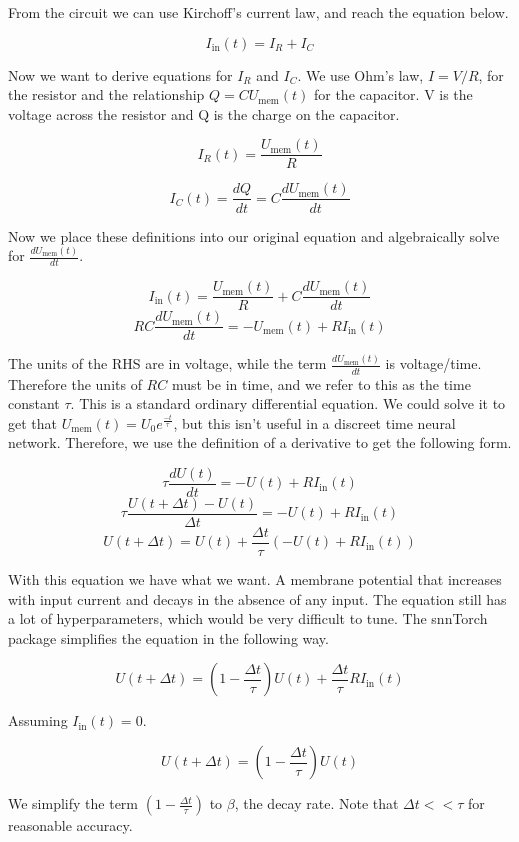 \documentclass [MS] {UCLAthesis}
\begin{document}
From the circuit we can use Kirchoff's current law, and reach the equation below.

$$ I_\text{in}(t) = I_R + I_C $$

Now we want to derive equations for $ I_R $ and $ I_C $. We use Ohm's law, $ I = V/R $, for the resistor and the relationship $ Q = CU_\text{mem}(t) $ for the capacitor. V is the voltage across the resistor and Q is the charge on the capacitor.  

$$ I_R(t) = \frac{U_\text{mem}(t)}{R} $$

$$ I_C(t) = \frac{dQ}{dt} = C \frac{dU_\text{mem}(t)}{dt} $$

Now we place these definitions into our original equation and algebraically solve for $ \frac{dU_\text{mem}(t)}{dt} $.

$$ I_\text{in}(t) = \frac{U_\text{mem}(t)}{R} + C \frac{dU_\text{mem}(t)}{dt} $$
$$ RC \frac{dU_\text{mem}(t)}{dt} = -U_\text{mem}(t) + RI_\text{in}(t)$$

The units of the RHS are in voltage, while the term $\frac{dU_\text{mem}(t)}{dt}$ is voltage/time. Therefore the units of $RC$ must be in time, and we refer to this as the time constant $\tau$. This is a standard ordinary differential equation. We could solve it to get that $ U_\text{mem}(t) = U_0 e ^{\frac{-t}{\tau}} $, but this isn't useful in a discreet time neural network. Therefore, we use the definition of a derivative to get the following form.

$$ \tau \frac{dU(t)}{dt} = -U(t) + RI_\text{in}(t) $$
$$ \tau \frac{U(t + \Delta t) - U(t)}{\Delta t}  = -U(t) + RI_\text{in}(t) $$
$$ U(t + \Delta t) = U(t) + \frac{\Delta t}{\tau} (-U(t) + RI_\text{in}(t)) $$


With this equation we have what we want. A membrane potential that increases with input current and decays in the absence of any input. The equation still has a lot of hyperparameters, which would be very difficult to tune. The snnTorch package simplifies the equation in the following way.

$$ U(t + \Delta t) = (1 - \frac{\Delta t}{\tau}) U(t) + \frac{\Delta t}{\tau} R I_\text{in}(t)$$

Assuming $ I_\text{in}(t) = 0 $.

$$ U(t + \Delta t) = (1 - \frac{\Delta t}{\tau}) U(t) $$

We simplify the term $(1 - \frac{\Delta t}{\tau})$ to $\beta$, the decay rate. Note that $ \Delta t << \tau $ for reasonable accuracy. 
\end{document}
